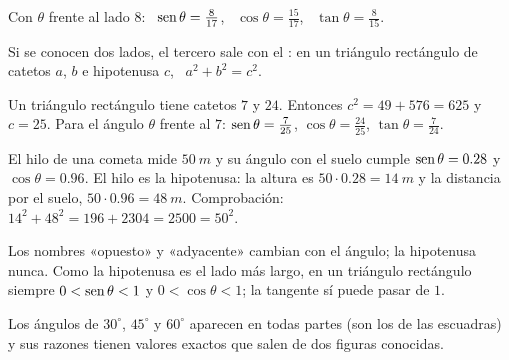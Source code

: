\documentclass[11pt,a4paper]{article}
\let\nivelorig\nivel
\renewcommand{\nivel}[2]{\Needspace{8\baselineskip}\nivelorig{#1}{#2}}
\begin{document}
\begin{ejemplo}[El triángulo $8$, $15$, $17$]
Con $\theta$ frente al lado $8$: \ $\operatorname{sen}\theta=\tfrac{8}{17}$, \ $\cos\theta=\tfrac{15}{17}$, \ $\tan\theta=\tfrac{8}{15}$.
\end{ejemplo}

Si se conocen dos lados, el tercero sale con el : en un triángulo rectángulo de catetos $a$,
$b$ e hipotenusa $c$, \ $a^2+b^2=c^2$.
\begin{ejemplo}
Un triángulo rectángulo tiene catetos $7$ y $24$. Entonces $c^2=49+576=625$ y $c=25$. Para el ángulo $\theta$
frente al $7$: $\operatorname{sen}\theta=\tfrac{7}{25}$, $\cos\theta=\tfrac{24}{25}$, $\tan\theta=\tfrac{7}{24}$.
\end{ejemplo}

\begin{ejemplo}[La cometa]
El hilo de una cometa mide $\SI{50}{m}$ y su ángulo con el suelo cumple $\operatorname{sen}\theta=0.28$ y $\cos\theta=0.96$. El hilo
es la hipotenusa: la altura es $50\cdot0.28=\SI{14}{m}$ y la distancia por el suelo, $50\cdot0.96=\SI{48}{m}$.
Comprobación: $14^2+48^2=196+2304=2500=50^2$.
\end{ejemplo}

\begin{ojo}
Los nombres «opuesto» y «adyacente» cambian con el ángulo; la hipotenusa nunca. Como la hipotenusa es el lado más
largo, en un triángulo rectángulo siempre $0<\operatorname{sen}\theta<1$ y $0<\cos\theta<1$; la tangente sí puede pasar de $1$.
\end{ojo}


Los ángulos de $30^\circ$, $45^\circ$ y $60^\circ$ aparecen en todas partes (son los de las escuadras) y sus razones
tienen valores exactos que salen de dos figuras conocidas.
\end{document}

